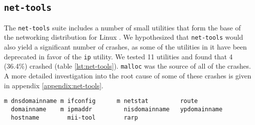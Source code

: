 \subsection{\texttt{net-tools}}
The \texttt{net-tools} suite includes a number of small utilities that form the base of the networking distribution for Linux \cite{nettools}. We hypothesized that \texttt{net-tools} would also yield a significant number of crashes, as some of the utilities in it have been deprecated in favor of the \texttt{ip} utility. We tested 11 utilities and found that 4 (36.4\%) crashed (table \ref{lst:net-tools}). \texttt{malloc} was the source of all of the crashes. A more detailed investigation into the root cause of some of these crashes is given in appendix \ref{appendix:net-tools}.

\PreTable
\begin{lstlisting}[label={lst:net-tools},caption={\texttt{net-tools} utilities tested; those which crashed with \texttt{malloc} are indicated with a \texttt{m} to their left. A total of 4/11 (36.4\%) crashed.}]
m dnsdomainname m ifconfig      m netstat         route
  domainname    m ipmaddr         nisdomainname   ypdomainname
  hostname        mii-tool        rarp
\end{lstlisting}
\PostTable
